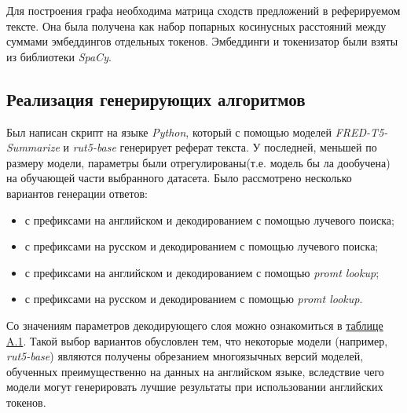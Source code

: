 \documentclass[12pt, a4paper]{article}
\begin{document}
    Для построения графа необходима матрица сходств предложений в реферируемом тексте. Она была получена как набор попарных косинусных расстояний между суммами эмбеддингов отдельных токенов. Эмбеддинги и токенизатор были взяты из библиотеки \textit{SpaCy}.

    \subsection{Реализация генерирующих алгоритмов}

    Был написан скрипт на языке \textit{Python}, который с помощью моделей \textit{FRED-T5-Summarize} и \textit{rut5-base} генерирует реферат текста. У последней, меньшей по размеру модели, параметры были отрегулированы(т.е. модель бы ла дообучена) на обучающей части выбранного датасета. Было рассмотрено несколько вариантов генерации ответов:
    
    \begin{itemize}
    	\item с префиксами на английском и декодированием с помощью лучевого поиска;
    	\item с префиксами на русском и декодированием с помощью лучевого поиска;
    	\item с префиксами на английском и декодированием с помощью \textit{promt lookup};
    	\item с префиксами на русском и декодированием с помощью \textit{promt lookup}.
    \end{itemize}
    Со значениям параметров декодирующего слоя можно ознакомиться в \hyperlink{params}{таблице A.1}. Такой выбор вариантов обусловлен тем, что некоторые модели (например, \textit{rut5-base}) являются получены обрезанием многоязычных версий моделей, обученных преимущественно на данных на английском языке, вследствие чего модели могут генерировать лучшие результаты при использовании английских токенов.
\end{document}
